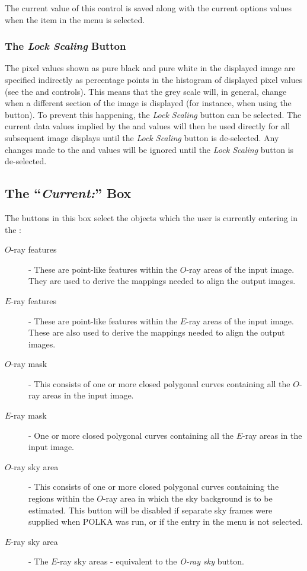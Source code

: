 \documentclass[11pt,nolof]{starlink}
\providecommand{\mylabel}[1] {\xlabel{#1}\label{#1}}
\begin{document}
The current value of this control is saved along with the current options
values when the  item in
the  menu is selected.

\subsubsection {\mylabel{POLKA_LOCK_SCALING}The \emph{Lock Scaling} Button}
The pixel values shown as pure black and pure white in the displayed
image are specified indirectly as percentage points in the histogram of
displayed pixel values (see the  and 
controls). This means that the grey scale will, in general, change when a
different section of the image is displayed (for instance, when using the
 button). To prevent this happening, the
\emph{Lock Scaling} button can be selected. The current data values
implied by the  and
 values will then be used
directly for all subsequent image displays until the \emph{Lock Scaling}
button is de-selected. Any changes made to the  and 
values will be ignored until the \emph{Lock Scaling} button is
de-selected.

\subsection {\mylabel{POLKA_CURRENT}The ``\emph{Current:}'' Box}
The buttons in this box select the objects which the user is currently
entering in the :

\begin{description}
\item [$O$-ray features] - These are point-like features within the
$O$-ray areas of the input image. They are used to derive the mappings
needed to align the output images.
\item [$E$-ray features] - These are point-like features within the
$E$-ray areas of the input image. These are also used to derive the mappings
needed to align the output images.
\item [$O$-ray mask] - This consists of one or more closed polygonal curves
containing all the $O$-ray areas in the input image.
\item [$E$-ray mask] - One or more closed polygonal curves
containing all the $E$-ray areas in the input image.
\item [$O$-ray sky area] - This consists of one or more closed polygonal curves
containing the regions within the $O$-ray area in which the sky
background is to be estimated. This button will be disabled if
separate sky frames were supplied when POLKA was run, or if the
 entry in the  menu is not selected.
\item [$E$-ray sky area] - The $E$-ray sky areas - equivalent to the
\emph{O-ray sky} button.
\end{description}
\end{document}
